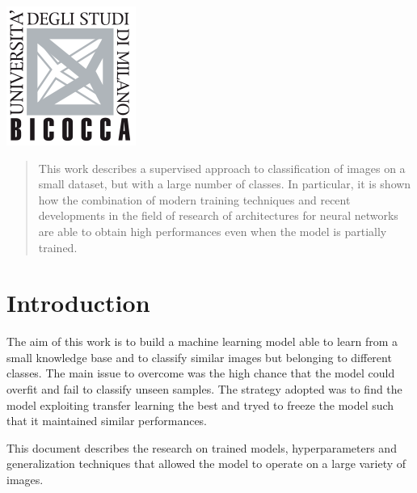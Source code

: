 \begin{titlepage}

\includegraphics{logo.png}\\[1cm] %
 

\vfill %

\end{titlepage}


\begin{abstract}
This work describes a supervised approach to classification of images on a small dataset, but with a large number of classes. In particular, it is shown how the
combination of modern training techniques and recent developments
in the field of research of architectures for neural networks are able
to obtain high performances even when the model is partially trained.
\end{abstract}

\section{Introduction}


The aim of this work is to build a machine learning model able to learn from a small knowledge base and to classify similar images but belonging to different classes.
The main issue to overcome was the high chance that the model could overfit and fail to classify unseen samples. The strategy adopted was to find the model exploiting transfer learning the best and tryed to freeze the model such that it maintained similar performances. \par
This document describes the research on trained models, hyperparameters and generalization techniques that allowed the model to operate on a large variety of images. 






